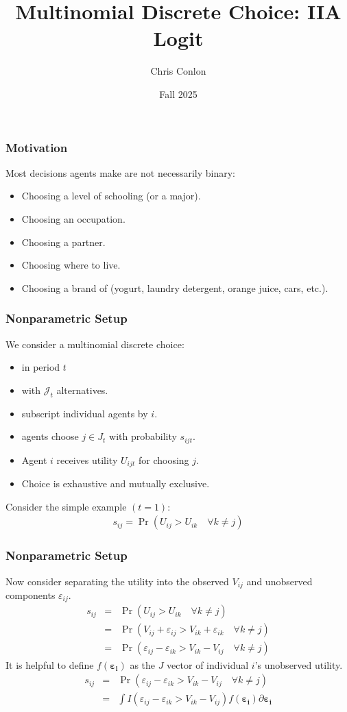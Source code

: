  

\title{Multinomial Discrete Choice: IIA Logit}
\author{Chris Conlon}
\date{Fall 2025}

\frame{\titlepage}


\begin{frame}
\frametitle{Motivation}
Most decisions agents make are not necessarily binary:
\begin{itemize}
\item Choosing a level of schooling (or a major).
\item Choosing an occupation.
\item Choosing a partner.
\item Choosing where to live.
\item Choosing a brand of (yogurt, laundry detergent, orange juice, cars, etc.).
 \end{itemize}
\end{frame}

\begin{frame}
\frametitle{Nonparametric Setup}
We consider a \alert{multinomial discrete choice}:
\begin{itemize}
\item in period $t$
\item with $\mathcal{J}_t$ alternatives.
\item subscript individual agents by $i$.
\item agents choose $j \in J_t$ with probability $s_{ijt}$.
\item Agent $i$ receives utility $U_{ijt}$ for choosing $j$.
\item Choice is exhaustive and mutually exclusive.
 \end{itemize}\pause
Consider the simple example $(t=1)$:
\begin{eqnarray*}
s_{ij} = \Pr( U_{ij} > U_{ik} \quad \forall k \neq j)
\end{eqnarray*}
\end{frame}

\begin{frame}
\frametitle{Nonparametric Setup}
Now consider separating the utility into the \alert{observed} $V_{ij}$ and \alert{unobserved} components $\varepsilon_{ij}$.
\begin{eqnarray*}
s_{ij} &=& \Pr( U_{ij} > U_{ik} \quad \forall k \neq j)\\
 &=& \Pr( V_{ij} + \varepsilon_{ij} > V_{ik} + \varepsilon_{ik} \quad \forall k \neq j)\\
 &=& \Pr( \varepsilon_{ij}-\varepsilon_{ik} > V_{ik} - V_{ij} \quad \forall k \neq j)
\end{eqnarray*}
\pause
It is helpful to define $f(\boldsymbol{\varepsilon_{i}})$ as the $J$ vector of individual $i$'s unobserved utility.
\begin{eqnarray*}
s_{ij} &=& \Pr( \varepsilon_{ij}-\varepsilon_{ik} > V_{ik} - V_{ij} \quad \forall k \neq j)\\
&=& \int I( \varepsilon_{ij}-\varepsilon_{ik} > V_{ik} - V_{ij} ) f( \boldsymbol{\varepsilon_i}) \partial \boldsymbol{\varepsilon_i} \\
\end{eqnarray*}
\end{frame}

